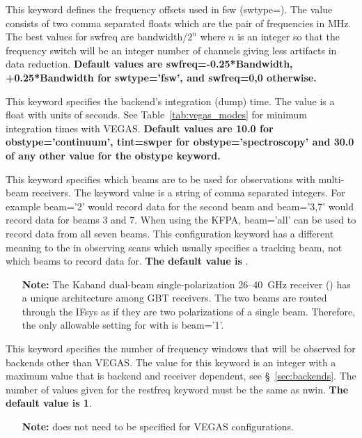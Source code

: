 \begin{description}[font=\bfseries\large,leftmargin=*,align=right]
\item[swfreq]  This keyword defines the frequency offsets used in \gls{fsw}
(swtype=).  The value consists of two comma separated floats which
are the pair of frequencies in MHz. The best values for swfreq are
bandwidth/$2^{n}$ where $n$ is an integer so that the frequency switch will
be an integer number of channels giving less artifacts in data reduction.
{\bf Default values are swfreq=-0.25*Bandwidth, +0.25*Bandwidth for 
swtype='fsw', and swfreq=0,0 otherwise.}

\item[tint] This keyword specifies the backend's integration (dump) time.
The value is a float with units of seconds. See Table~\ref{tab:vegas_modes}
for minimum integration times with \gls{VEGAS}.
{\bf Default values are 10.0 for obstype='continuum', tint=swper for
obstype='spectroscopy' and 30.0 of any other value for the obstype
keyword.}

\item[beam]  {This keyword specifies which beams are to be used for
observations with multi-beam receivers.   The keyword value is a string
of comma separated integers.  For example beam='2' would record data for
the second beam and beam='3,7' would record data for beams 3 and 7.
When using the \gls{KFPA}, beam='all' can be used to record
data from all seven beams. This  configuration keyword has a
different meaning to the  in observing scans which usually
specifies a tracking beam, not which beams to record data for.
{\bf The default value is }.}
\begin{itemize}
\item [{\bf Note:}] The \gls{Kaband} dual-beam single-polarization 26--40~GHz
receiver () has a unique architecture among \gls{GBT} receivers.
The two beams are routed through the \gls{IFsys} as if they are two
polarizations of a single beam.  Therefore, the only allowable setting for
 with  is beam='1'.
\end{itemize}

\item[nwin] {This keyword specifies the number of frequency windows that will
be observed for backends other than \gls{VEGAS}. The value for this keyword
is an integer with a maximum value that is backend and receiver dependent,
see \S~\ref{sec:backends}. The number of values given for
the restfreq keyword must be the same as nwin.  {\bf The default value is 1}.}
\begin{itemize}
\item [{\bf Note:}]  does not need to be specified for \gls{VEGAS}
configurations.
\end{itemize}


\end{description}
